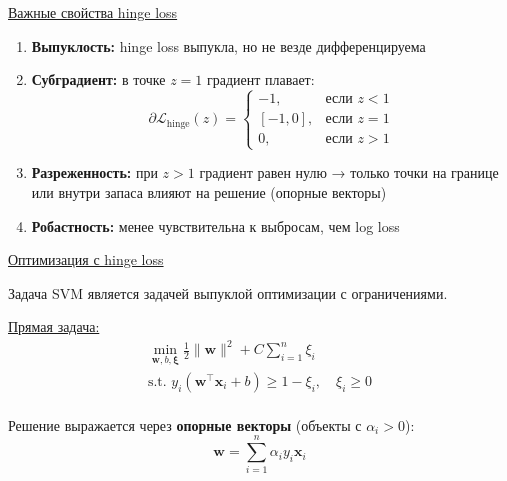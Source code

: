 \underline{Важные свойства hinge loss}

\begin{enumerate}
    \item \textbf{Выпуклость:} hinge loss выпукла, но не везде дифференцируема
    \item \textbf{Субградиент:} в точке $z = 1$ градиент плавает:
    \[ \partial \mathcal{L}_{\text{hinge}}(z) =
    \begin{cases}
        -1, & \text{если } z < 1 \\
        [ -1, 0 ], & \text{если } z = 1 \\
        0, & \text{если } z > 1
    \end{cases} \]
    
    \item \textbf{Разреженность:} при $z > 1$ градиент равен нулю → только точки на границе или внутри запаса
    влияют на решение (опорные векторы)
    \item \textbf{Робастность:} менее чувствительна к выбросам, чем log loss
\end{enumerate}

\underline{Оптимизация с hinge loss}

Задача SVM является задачей выпуклой оптимизации с ограничениями.

\underline{Прямая задача:}
\begin{gather*}
    \min_{\bm{w}, b, \bm{\xi}} \frac{1}{2} \|\bm{w}\|^2 + C \sum_{i=1}^n \xi_i\\
    \text{s.t. } y_i(\bm{w}^\top \bm{x}_i + b) \geq 1 - \xi_i, \quad \xi_i \geq 0\\
\end{gather*}

Решение выражается через \textbf{опорные векторы} (объекты с $\alpha_i > 0$):
\[ \bm{w} = \sum_{i=1}^n \alpha_i y_i \bm{x}_i \]

